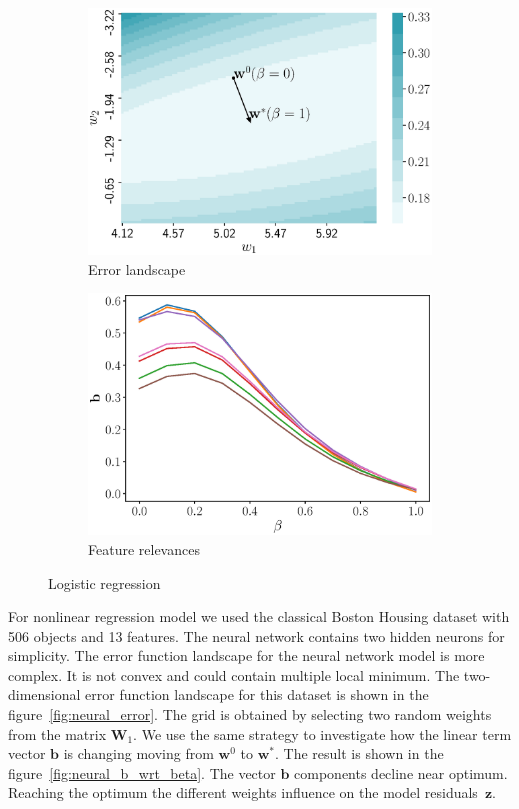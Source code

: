 \documentclass[a4paper,12pt]{article}
\theoremstyle{plain} %
\theoremstyle{definition} %
\theoremstyle{remark} %
\newcommand{\bb}{\mathbf{b}}
\newcommand{\bw}{\mathbf{w}}
\newcommand{\bz}{\mathbf{z}}
\newcommand{\bW}{\mathbf{W}}
\begin{document}
	\begin{figure}
		\centering
		\begin{subfigure}{.5\textwidth}
			\centering
			\includegraphics[width=\linewidth]{figs/log_reg_error}
			\caption{Error landscape}
			\label{fig:log_reg_error}
		\end{subfigure}%
		\begin{subfigure}{.5\textwidth}
			\centering
			\includegraphics[width=\linewidth]{figs/log_reg_b_wrt_beta.eps}
			\caption{Feature relevances}
			\label{fig:log_reg_b_wrt_beta}
		\end{subfigure}
		\caption{Logistic regression}
	\end{figure}
  	
  	For nonlinear regression model we used the classical Boston Housing dataset with 506 objects and 13 features.
  	The neural network contains two hidden neurons for simplicity.
  	The error function landscape for the neural network model is more complex. 
  	It is not convex and could contain multiple local minimum.
  	The two-dimensional error function landscape for this dataset is shown in the figure~\ref{fig:neural_error}. 
  	The grid is obtained by selecting two random weights from the matrix $\bW_1$.
  	We use the same strategy to investigate how the linear term vector $\bb$ is changing moving from $\bw^0$ to $\bw^*$. 
  	The result is shown in the figure~\ref{fig:neural_b_wrt_beta}.
  	The vector $\bb$ components decline near optimum. Reaching the optimum the different weights influence on the model residuals~$\bz$.
  
\end{document}
